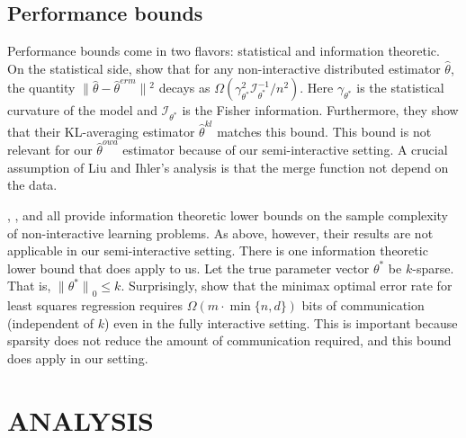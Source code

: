 \documentclass[twoside]{article}
\newcommand{\w}{\theta}
\newcommand{\wkl}{\hat\w^{kl}}
\newcommand{\wowa}{\hat\w^{owa}}
\newcommand{\wmle}{\hat\w^{erm}}
\newcommand{\wstar}{{\w^{*}}}
\newcommand{\what}{{\hat\w}}
\newcommand{\wq}{\hat\w^{q}}
\newcommand{\I}{\mathcal I}
\newcommand{\ltwo}[1]{{\lVert {#1} \rVert}}
\newcommand{\lzero}[1]{{\lVert {#1} \rVert}_0}
\begin{document}
\subsection{Performance bounds}
\label{sec:bounds}

Performance bounds come in two flavors: statistical and information theoretic.
On the statistical side, \citet{liu2014distributed} show that for any non-interactive distributed estimator $\what$,
the quantity $\ltwo{\what-\wmle}{}^2$ decays as $\Omega(\gamma^2_\wstar \I^{-1}_\wstar/n^2)$.
Here $\gamma_\wstar$ is the statistical curvature of the model and $\I_\wstar$ is the Fisher information.
Furthermore, they show that their KL-averaging estimator $\wkl$ matches this bound.
This bound is not relevant for our $\wowa$ estimator because of our semi-interactive setting.
A crucial assumption of Liu and Ihler's analysis is that the merge function not depend on the data.

\citet{shamir2014fundamental}, \citet{zhang2013information}, and \citet{garg2014communication} all provide information theoretic lower bounds on the sample complexity of non-interactive learning problems.
As above, however, their results are not applicable in our semi-interactive setting.
There is one information theoretic lower bound that does apply to us.
Let the true parameter vector $\wstar$ be $k$-sparse.
That is, $\lzero{\wstar} \le k$.
Surprisingly, \citet{braverman2015communication} show that the minimax optimal error rate for least squares regression requires $\Omega(m\cdot\min\{n,d\})$ bits of communication (independent of $k$) even in the fully interactive setting.
This is important because sparsity does not reduce the amount of communication required, and this bound does apply in our setting.


\section{ANALYSIS}
\label{sec:anal}
\end{document}
